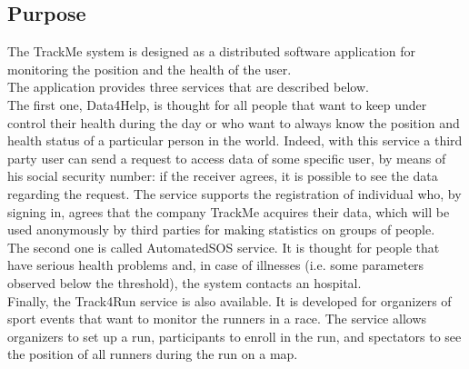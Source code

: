 \subsection{Purpose}
\par
The TrackMe system is designed as a distributed software application for monitoring the position and the health of the user. \\
The application provides three services that are described below. \\
The first one, Data4Help, is thought for all people that want to keep under control their health during the day or who want to always know the position and health status of a particular person in the world. Indeed, with this service a third party user can send a request to access data of some specific user, by means of his social security number: if the receiver agrees, it is possible to see the data regarding the request. The service supports the registration of individual who, by signing in, agrees that the company TrackMe acquires their data, which will be used anonymously by third parties for making statistics on groups of people. \\
The second one is called AutomatedSOS service. It is thought for people that have serious health problems and, in case of illnesses (i.e. some parameters observed below the threshold), the system contacts an hospital. \\
Finally, the Track4Run service is also available. 
It is developed for organizers of sport events that want to monitor the runners in a race. The service allows organizers to set up a run, participants to enroll in the run, and spectators to see the position of all runners during the run on a map. \\

